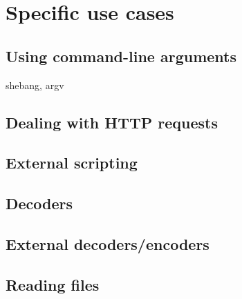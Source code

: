 \chapter{Specific use cases}
\section{Using command-line arguments}
shebang, argv

\section{Dealing with HTTP requests}

\section{External scripting}

\section{Decoders}

\section{External decoders/encoders}

\section{Reading files}

